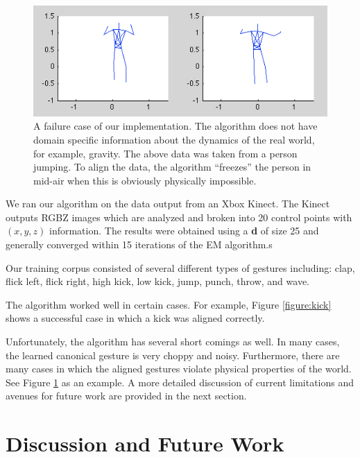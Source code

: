 \documentclass{article}
\begin{document}
\begin{figure}
\begin{centering}
\includegraphics[width=\columnwidth]{figures/jump.png}

\caption{A failure case of our implementation. The algorithm does not have
domain specific information about the dynamics of the real world, for example,
gravity. The above data was taken from a person jumping. To align the data,
the algorithm ``freezes'' the person in mid-air when this is obviously
physically impossible. \label{figure:jump}}

\end{centering}
\end{figure}

We ran our algorithm on the data output from an Xbox Kinect. The Kinect outputs
RGBZ images which are analyzed and broken into 20 control points with
$\left(x,y,z\right)$ information. The results were obtained using a \textbf{d}
of size 25 and generally converged within 15 iterations of the EM algorithm.s

Our training corpus consisted of several different types of gestures including:
clap, flick left, flick right, high kick, low kick, jump, punch, throw, and
wave. 

The algorithm worked well in certain cases. For example, Figure
\ref{figure:kick} shows a successful case in which a kick was aligned correctly.

Unfortunately, the algorithm has several short comings as well. In many cases,
the learned canonical gesture is very choppy and noisy. Furthermore, there are
many cases in which the aligned gestures violate physical properties of the
world. See Figure \ref{figure:jump} as an example. A more detailed discussion of
current limitations and avenues for future work are provided in the next
section.


\section{Discussion and Future Work}
\end{document}
